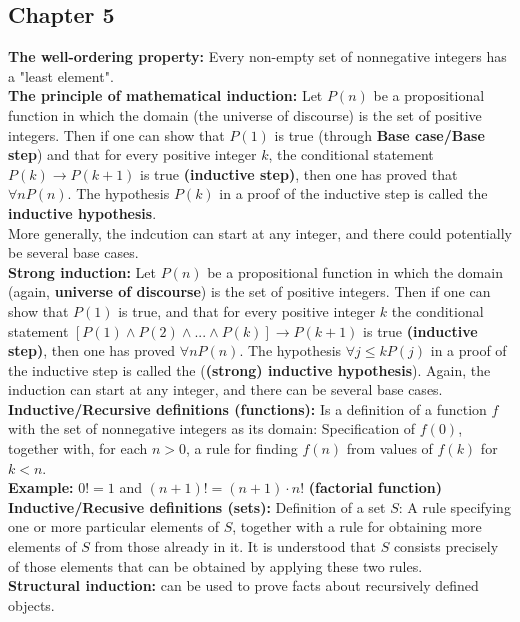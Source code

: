 \documentclass[12pt]{article}
\begin{document}
\subsection{Chapter 5}
\textbf{The well-ordering property:} Every non-empty set of nonnegative integers has a "least element". \\
\textbf{The principle of mathematical induction:} Let $P(n)$ be a propositional function in which the domain (the universe of discourse) is the set of positive integers. Then if one can show that $P(1)$ is true (through \textbf{Base case/Base step}) and that for every positive integer $k$, the conditional statement $P(k) \rightarrow P(k+1)$ is true \textbf{(inductive step)}, then one has proved that $\forall n P(n)$. The hypothesis $P(k)$ in a proof of the inductive step is called the \textbf{inductive hypothesis}. \\
More generally, the indcution can start at any integer, and there could potentially be several base cases. \\
\textbf{Strong induction:} Let $P(n)$ be a propositional function in which the domain (again, \textbf{universe of discourse}) is the set of positive integers. Then if one can show that $P(1)$ is true, and that for every positive integer $k$ the conditional statement $[P(1) \wedge P(2) \wedge ... \wedge P(k)] \rightarrow P(k + 1)$ is true \textbf{(inductive step)}, then one has proved $\forall n P(n)$. The hypothesis $\forall j \leq k P(j)$ in a proof of the inductive step is called the (\textbf{(strong) inductive hypothesis}). Again, the induction can start at any integer, and there can be several base cases. \\
\textbf{Inductive/Recursive definitions (functions):} Is a definition of a function $f$ with the set of nonnegative integers as its domain: Specification of $f(0)$, together with, for each $n > 0$, a rule for finding $f(n)$ from values of $f(k)$ for $k < n$. \\
\textbf{Example:} $0! = 1$ and $(n + 1)! = (n + 1) \cdot n!$ \textbf{(factorial function)} \\
\medskip
\textbf{Inductive/Recusive definitions (sets):} Definition of a set $S$: A rule specifying one or more particular elements of $S$, together with a rule for obtaining more elements of $S$ from those already in it. It is understood that $S$ consists precisely of those elements that can be obtained by applying these two rules. \\
\textbf{Structural induction:} can be used to prove facts about recursively defined objects. \\
\end{document}
